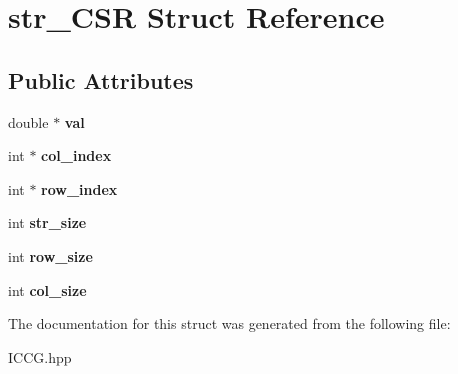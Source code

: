 \hypertarget{structstr__CSR}{}\section{str\+\_\+\+C\+SR Struct Reference}
\label{structstr__CSR}
\subsection*{Public Attributes}
\begin{DoxyCompactItemize}
\item 
double $\ast$ {\bfseries val}\hypertarget{structstr__CSR_af7f9898e5d71489f9b2b8d68b2058b9e}{}\label{structstr__CSR_af7f9898e5d71489f9b2b8d68b2058b9e}

\item 
int $\ast$ {\bfseries col\+\_\+index}\hypertarget{structstr__CSR_ad2d5a70e88807559e5b334681a9d638c}{}\label{structstr__CSR_ad2d5a70e88807559e5b334681a9d638c}

\item 
int $\ast$ {\bfseries row\+\_\+index}\hypertarget{structstr__CSR_a4d2dcfc673ec379f409a5393f5833baf}{}\label{structstr__CSR_a4d2dcfc673ec379f409a5393f5833baf}

\item 
int {\bfseries str\+\_\+size}\hypertarget{structstr__CSR_ac82afcb817c5bd828659d9208248513a}{}\label{structstr__CSR_ac82afcb817c5bd828659d9208248513a}

\item 
int {\bfseries row\+\_\+size}\hypertarget{structstr__CSR_a538bc5a5f4f1c6ff8e50948153956bd5}{}\label{structstr__CSR_a538bc5a5f4f1c6ff8e50948153956bd5}

\item 
int {\bfseries col\+\_\+size}\hypertarget{structstr__CSR_acc3dbe6425684d0d805b780604f0dcf6}{}\label{structstr__CSR_acc3dbe6425684d0d805b780604f0dcf6}

\end{DoxyCompactItemize}


The documentation for this struct was generated from the following file\+:\begin{DoxyCompactItemize}
\item 
I\+C\+C\+G.\+hpp\end{DoxyCompactItemize}

